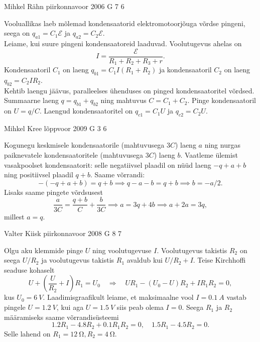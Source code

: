 \documentclass[11pt]{article}
\begin{document}
{%
{Mihkel Rähn} %
{piirkonnavoor} %
{2006} %
{G 7} %
{6} %
{

\ifSolution
\osa Vooluallikas laeb mõlemad kondensaatorid elektromotoorjõuga võrdse pingeni, seega on $q_{a1} = C_1\mathcal E$ ja $q_{a2} = C_2\mathcal E$.\\
\osa Leiame, kui suure pingeni kondensaatoreid laaduvad. Voolutugevus ahelas
on
\[
I = \frac{\mathcal E}{R_1+R_2+R_3+r}.
\]
Kondensaatoril $C_1$ on laeng $q_{b1} = C_1I(R_1 + R_2)$ ja kondensaatoril $C_2$ on laeng $q_{b2} = C_2IR_2$.\\
\osa Kehtib laengu jäävus, paralleelses ühenduses on pinged kondensaatoritel võrdsed. Summaarne laeng $q = q_{b1} + q_{b2}$ ning mahtuvus $C = C_1 + C_2$. Pinge kondensaatoril on $U = q/C$. Laengud kondensaatoritel on $q_{c1} = C_1U$ ja $q_{c2} = C_2U$. 
\fi
}

{Mihkel Kree} %
{lõppvoor} %
{2009} %
{G 3} %
{6} %
{

\ifSolution
Kogunegu keskmisele kondensaatorile (mahtuvusega $3C$) laeng $a$ ning nurgas paiknevatele kondensaatoritele (mahtuvusega $3C$) laeng $b$. Vaatleme ülemist vasakpoolset kondensaatorit: selle negatiivsel plaadil on nüüd laeng $-q+a+b$ ning positiivsel plaadil $q+b$. Saame võrrandi:
\[-(-q+a+b)=q+b \implies q-a-b=q+b \implies b=-a/2.\]
Lisaks saame pingete võrdsusest
\[\frac{a}{3C}=\frac{q+b}{C}+\frac{b}{3C}\implies a=3q+4b\implies a+2a=3q,\]
millest $a=q$.
\fi
}

{Valter Kiisk} %
{piirkonnavoor} %
{2008} %
{G 8} %
{7} %
{

\ifSolution
Olgu aku klemmide pinge $U$ ning voolutugevuse $I$. Voolutugevus takistis $R_2$ on seega $U/R_2$ ja voolutugevus takistis $R_1$ avaldub kui $U/R_2 + I$. Teise Kirchhoffi seaduse kohaselt 
\[
U+\left(\frac{U}{R_{2}}+I\right) R_{1}=U_{0} \quad \Rightarrow \quad U R_{1}-\left(U_{0}-U\right) R_{2}+I R_{1} R_{2}=0,
\]
kus $U_0 = \SI{6}{V}$. Laadimisgraafikult leiame, et maksimaalne vool $I = \SI{0,1}{A}$ vastab pingele $U = \SI{1,2}{V}$, kui aga $U = \SI{1,5}{V}$ siis peab olema $I = 0$. Seega $R_1$ ja $R_2$ määramiseks saame võrrandisüsteemi 
\[
\num{1,2}R_1 - \num{4,8}R_2 + \num{0,1}R_1R_2 = 0, \quad \num{1,5}R_1 - \num{4,5}R_2 = 0. 
\]
Selle lahend on $R_1 = \SI{12}{\ohm}, R_2 = \SI{4}{\ohm}$.
\fi
}

}
\end{document}

